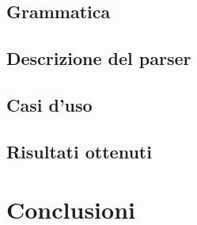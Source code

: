 \documentclass[]{article}
\begin{document}
\subsection{Grammatica}
\subsection{Descrizione del parser}
\subsection{Casi d'uso}
\subsection{Risultati ottenuti}
\section{Conclusioni}






\end{document}
